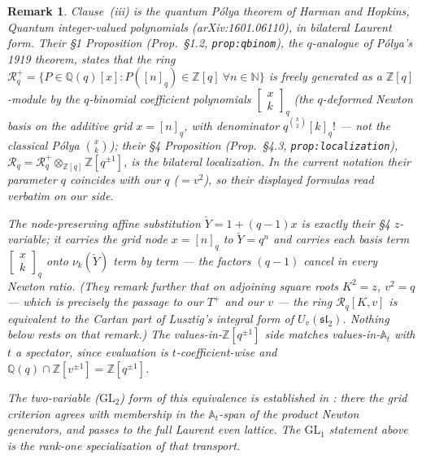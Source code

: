 \documentclass[11pt]{article}
\newtheorem{remark}{Remark}
\newcommand{\At}{\mathbb{A}_t}
\newcommand{\Yc}{\check Y}
\newcommand{\Z}{\mathbb Z}
\begin{document}
\begin{remark}
Clause~(iii) is the quantum P\'olya theorem of Harman and Hopkins,
\emph{Quantum integer-valued polynomials} (arXiv:1601.06110), in bilateral
Laurent form. Their \S1 Proposition (Prop.~\S1.2, \texttt{prop:qbinom}), the
$q$-analogue of P\'olya's 1919 theorem, states that the ring
$\mathcal R_q^{+}=\{P\in\mathbb Q(q)[x]:P([n]_q)\in\Z[q]\ \forall n\in\mathbb N\}$
is freely generated as a $\Z[q]$-module by the $q$-binomial coefficient
polynomials $\begin{bmatrix}x\\k\end{bmatrix}_{q}$ (the $q$-deformed Newton
basis on the \emph{additive} grid $x=[n]_q$, with denominator
$q^{\binom{k}{2}}[k]_q!$ --- not the classical P\'olya $\binom{x}{k}$); their \S4
Proposition (Prop.~\S4.3, \texttt{prop:localization}),
$\mathcal R_q=\mathcal R_q^{+}\otimes_{\Z[q]}\Z[q^{\pm1}]$, is the bilateral
localization. In the current notation their parameter $q$ coincides with our
$q$ ($=v^{2}$), so their displayed formulas read verbatim on our side.

The node-preserving affine substitution $\Yc=1+(q-1)x$ is exactly their \S4
$z$-variable; it carries the grid node $x=[n]_q$ to $\Yc=q^{n}$ and carries each
basis term $\begin{bmatrix}x\\k\end{bmatrix}_{q}$ onto $\nu_k(\Yc)$ \emph{term by
term} --- the factors $(q-1)$ cancel in every Newton ratio. (They remark further
that on adjoining square roots $K^{2}=z$, $v^{2}=q$ --- which is precisely the
passage to our $T^{+}$ and our $v$ --- the ring $\mathcal R_q[K,v]$ is equivalent
to the Cartan part of Lusztig's integral form of $U_v(\mathfrak{sl}_2)$. Nothing
below rests on that remark.) The values-in-$\Z[q^{\pm1}]$
side matches values-in-$\At$ with $t$ a spectator, since evaluation is
$t$-coefficient-wise and $\mathbb Q(q)\cap\Z[v^{\pm1}]=\Z[q^{\pm1}]$.

The two-variable ($\mathrm{GL}_2$) form of this equivalence is established in
\cite{SandboxGL2}: there the grid criterion agrees with membership in the
$\At$-span of the product Newton generators, and passes to the full Laurent
even lattice. The $\mathrm{GL}_1$ statement above is the rank-one specialization of
that transport.
\end{remark}
\end{document}
